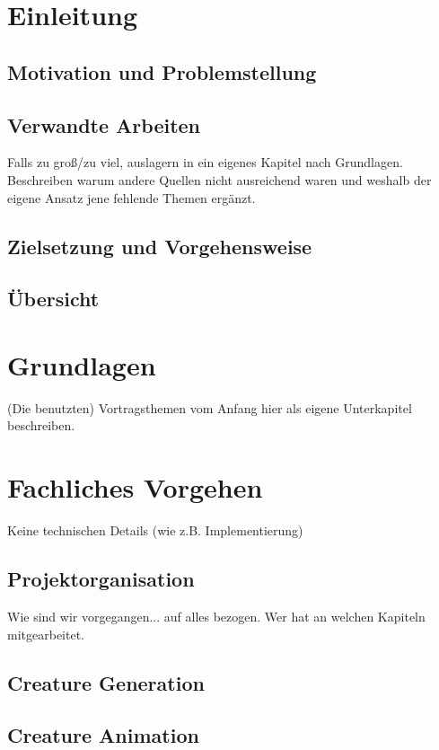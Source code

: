 \documentclass{article}
\begin{document}
	
	\section{Einleitung}
	
		\subsection{Motivation und Problemstellung}
		
		\subsection{Verwandte Arbeiten}
		Falls zu groß/zu viel, auslagern in ein eigenes Kapitel nach Grundlagen. Beschreiben warum andere Quellen nicht ausreichend waren und weshalb der eigene Ansatz jene fehlende Themen ergänzt.
		
		\subsection{Zielsetzung und Vorgehensweise}
		
		\subsection{Übersicht}
	
	
	\section{Grundlagen}
	(Die benutzten) Vortragsthemen vom Anfang hier als eigene Unterkapitel beschreiben.
		
		
	\section{Fachliches Vorgehen}
	Keine technischen Details (wie z.B. Implementierung)
	
		\subsection{Projektorganisation}
		Wie sind wir vorgegangen... auf alles bezogen. Wer hat an welchen Kapiteln mitgearbeitet.
	
		\subsection{Creature Generation}
		
		\subsection{Creature Animation}
		
\end{document}

